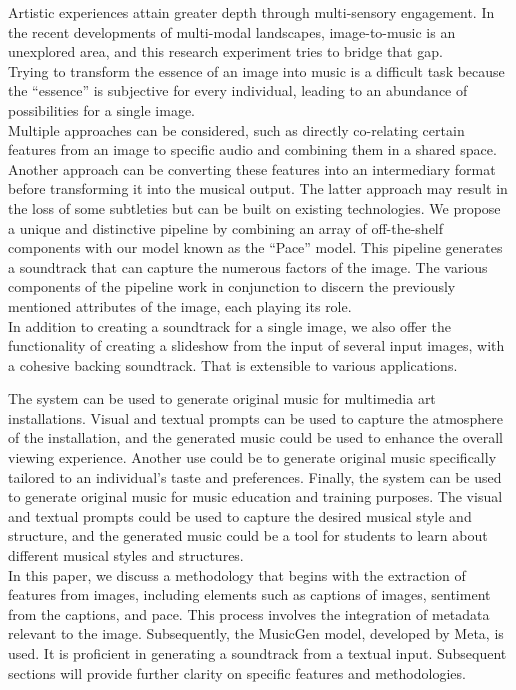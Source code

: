 \documentclass[conference]{IEEEtran}
\begin{document}
{
Artistic experiences attain greater depth through multi-sensory engagement. In the recent developments of multi-modal landscapes, image-to-music is an unexplored area, and this research experiment tries to bridge that gap.
\\

Trying to transform the essence of an image into music is a difficult task because the ``essence'' is subjective for every individual, leading to an abundance of possibilities for a single image.
\\

Multiple approaches can be considered, such as directly co-relating certain features from an image to specific audio and combining them in a shared space. Another approach can be converting these features into an intermediary format before transforming it into the musical output. The latter approach may result in the loss of some subtleties but can be built on existing technologies.
We propose a unique and distinctive pipeline by combining an array of off-the-shelf components with our model known as the ``Pace'' model. This pipeline generates a soundtrack that can capture the numerous factors of the image. The various components of the pipeline work in conjunction to discern the previously mentioned attributes of the image, each playing its role.
\\

In addition to creating a soundtrack for a single image, we also offer the functionality of creating a slideshow from the input of several input images, with a cohesive backing soundtrack. That is extensible to various applications.

The system can be used to generate original music for multimedia art installations. Visual and textual prompts can be used to capture the atmosphere of the installation, and the generated music could be used to enhance the overall viewing experience. Another use could be to generate original music specifically tailored to an individual's taste and preferences. Finally, the system can be used to generate original music for music education and training purposes. The visual and textual prompts could be used to capture the desired musical style and structure, and the generated music could be a tool for students to learn about different musical styles and structures.
\\

In this paper, we discuss a methodology that begins with the extraction of features from images, including elements such as captions of images, sentiment from the captions, and pace. This process involves the integration of metadata relevant to the image. Subsequently, the MusicGen model, developed by Meta, is used. It is proficient in generating a soundtrack from a textual input. Subsequent sections will provide further clarity on specific features and methodologies.
}
\end{document}
